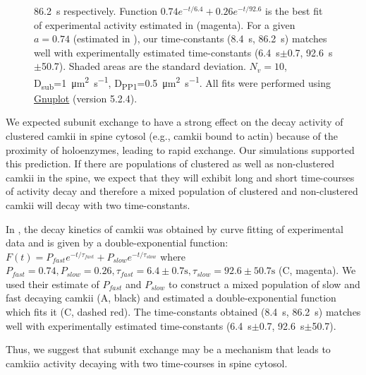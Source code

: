 \documentclass[9pt,lineno]{elife}
\newcommand\SUB[2]{#1\textsubscript{#2}}
\begin{document}
\begin{figure}
{        \SI{86.2}{\second} respectively. 
        Function $0.74e^{-t/6.4}+0.26e^{-t/92.6}$ is the best fit of
        experimental activity estimated in \citep{chang_camkii_2017} (magenta). 
        For a given $a=0.74$ (estimated in \citep{chang_camkii_2017}), our time-constants
        (\SI{8.4}{\second}, \SI{86.2}{\second}) matches well with experimentally
        estimated time-constants (\SI{6.4}{\second}$\pm$0.7, \SI{92.6}{\second}$\pm$50.7). 
        Shaded areas are the standard deviation. $N_{v}=10$,
        \SUB{D}{sub}=\SI{1}{\micro\meter\squared\per\second},
        \SUB{D}{PP1}=\SI{0.5}{\micro\meter\squared\per\second}.
        All fits were performed using 
        \href{https://gnuplot.info}{Gnuplot} (version 5.2.4).
    }\label{fig:cytosol_integrator}
\end{figure}

We expected subunit exchange to have a strong effect on the decay activity of
clustered \gls{camkii} in spine cytosol (e.g., \gls{camkii} bound to actin)
because of the proximity of holoenzymes, leading to rapid exchange.  Our
simulations supported this prediction. If there are populations of clustered as
well as non-clustered \gls{camkii} in the spine, we expect that they will
exhibit long and short time-courses of activity decay and therefore a mixed
population of clustered and non-clustered \gls{camkii} will decay with two
time-constants. 

In \citep{chang_camkii_2017}, the decay kinetics of \gls{camkii} was obtained by
curve fitting of experimental data and is given by a double-exponential
function: $F(t)=P_{fast}e^{-t/\tau_{fast}}+P_{slow}e^{-t/\tau_{slow}}$ where
$P_{fast}=0.74, P_{slow}=0.26,  \tau_{fast}= 6.4\pm0.7 \si{\second},
\tau_{slow}=92.6 \pm 50.7\si{\second}$ (C, magenta).  We
used their estimate of $P_{fast}$ and $P_{slow}$ to construct a mixed population
of slow and fast decaying \gls{camkii} (A, black) and
estimated a double-exponential function which fits it
(C, dashed red). The time-constants obtained
(\SI{8.4}{\second}, \SI{86.2}{\second}) matches well with experimentally
estimated time-constants (\SI{6.4}{\second}$\pm$0.7,
\SI{92.6}{\second}$\pm$50.7). 

Thus, we suggest that subunit exchange may be a mechanism that leads to
\gls{camkii}$\alpha$ activity decaying with two time-courses in spine 
cytosol.
\end{document}
